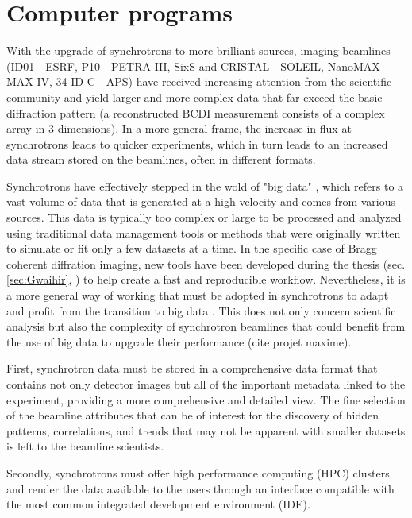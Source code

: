 \newpage
\section{Computer programs}

With the upgrade of synchrotrons to more brilliant sources, imaging beamlines (ID01 - ESRF, P10 - PETRA III, SixS and CRISTAL - SOLEIL, NanoMAX - MAX IV, 34-ID-C - APS) have received increasing attention from the scientific community and yield larger and more complex data that far exceed the basic diffraction pattern (a reconstructed BCDI measurement consists of a complex array in 3 dimensions).
In a more general frame, the increase in flux at synchrotrons leads to quicker experiments, which in turn leads to an increased data stream stored on the beamlines, often in different formats.

Synchrotrons have effectively stepped in the wold of "big data" \parencite{Alizada2017, Wang2018}, which refers to a vast volume of data that is generated at a high velocity and comes from various sources.
This data is typically too complex or large to be processed and analyzed using traditional data management tools or methods that were originally written to simulate or fit only a few datasets at a time.
In the specific case of Bragg coherent diffration imaging, new tools have been developed during the thesis (sec. \ref{sec:Gwaihir}, \cite{jerome_carnis_2021_5741935, Simonne2022}) to help create a fast and reproducible workflow.
Nevertheless, it is a more general way of working that must be adopted in synchrotrons to adapt and profit from the transition to big data \parencite{Wang2018}.
This does not only concern scientific analysis but also the complexity of synchrotron beamlines that could benefit from the use of big data to upgrade their performance (cite projet maxime).

First, synchrotron data must be stored in a comprehensive data format \parencite{Konnecke2015} that contains not only detector images but all of the important metadata linked to the experiment, providing a more comprehensive and detailed view.
The fine selection of the beamline attributes that can be of interest for the discovery of hidden patterns, correlations, and trends that may not be apparent with smaller datasets is left to the beamline scientists.

Secondly, synchrotrons must offer high performance computing (HPC) clusters \parencite{Wang2021} and render the data available to the users through an interface compatible with the most common integrated development environment (IDE).

